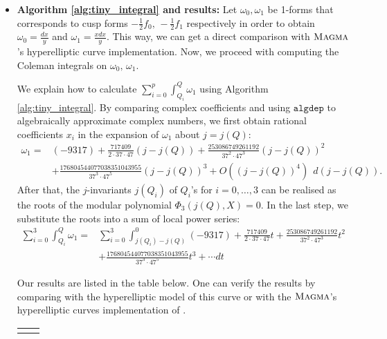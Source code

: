 \begin{itemize}
\item \textbf{Algorithm \ref{alg:tiny_integral} and results:} Let $\omega_0,\omega_1$ be 1-forms that corresponds to cusp forms $-\frac{1}{2}f_0,\,-\frac{1}{2}f_1$ respectively in order to obtain $\omega_0 = \frac{dx}{y}$ and $\omega_1 = \frac{xdx}{y}$. This way, we can get a direct comparison with $\textsc{Magma}{}$'s hyperelliptic curve implementation. Now, we proceed with computing the Coleman integrals on $\omega_0,\,\omega_1$. 




We explain how to calculate $\sum_{i=0}^{p}\int^Q_{Q_i} \omega_1$ using Algorithm \ref{alg:tiny_integral}. By comparing complex coefficients and using $\texttt{algdep}$ to algebraically approximate complex numbers, we first obtain rational coefficients $x_i$ in the expansion of $\omega_1$ about $j=j(Q)$:
\begin{align*} \omega_1  = &(-9317) + \frac{717409}{2 \cdot 37 \cdot 47}(j-j(Q))
                             + \frac{253086749261192}{37^2 \cdot 47^3}(j-j(Q))^2
  \\ &+ \frac{176804544077038351043955}{37^3 \cdot 47^5}(j-j(Q))^3 +
       O((j-j(Q))^4) \ \ d(j-j(Q)). \end{align*}
     After that, the $j$-invariants $j(Q_i)$ of $Q_i$'s for $i = 0,\ldots,3$ can be realised as the roots of the modular polynomial $\Phi_3(j(Q),X) =0 $. In the last step, we substitute the roots into a sum of local power series: 
\begin{align*}
    \sum_{i=0}^3 \int_{Q_i}^Q \omega_1 = &\sum_{i=0}^3 \int_{j(Q_i)-j(Q)}^{0} (-9317) + \frac{717409}{2 \cdot 37 \cdot 47}t + \frac{253086749261192}{37^2 \cdot 47^3}t^2 \\&+ \frac{176804544077038351043955}{37^3 \cdot 47^5}t^3 +  \cdots  dt 
\end{align*}


Our results are listed in the table below. One can verify the results by comparing with the hyperelliptic model of this curve or with the $\textsc{Magma}{}$'s hyperelliptic curves implementation of \cite{balatuit}.


\begin{table}[h]

    \centering
    \begin{tabular}{|l|l|}
    \hline
    \rule{0pt}{4ex}    


\end{tabular}
\end{table}
\end{itemize}
